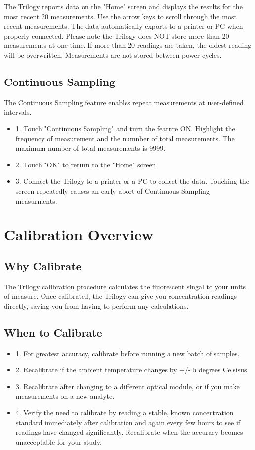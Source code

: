 \documentclass[12pt]{../SOP3_beta}
\begin{document}
\NP The Trilogy reports data on the "Home" screen and displays the results for the most recent 20 measurements. Use the arrow keys to scroll through the most recent measurements. The data automatically exports to a printer or PC when properly connected. Please note the Trilogy does NOT store more than 20 measurements at one time. If more than 20 readings are taken, the oldest reading will be overwritten. Measurements are not stored between power cycles.

\subsection{Continuous Sampling}
\NP The Continuous Sampling feature enables repeat measurements at user-defined intervals.
\begin{itemize}
  \item 1. Touch "Continuous Sampling" and turn the feature ON. Highlight the frequency of measurement and the numnber of total measurements. The maximum number of total measurements is 9999.
  \item 2. Touch "OK" to return to the "Home" screen.
  \item 3. Connect the Trilogy to a printer or a PC to collect the data. Touching the screen repeatedly causes an early-abort of Continuous Sampling measurments. 
\end{itemize}

\section{Calibration Overview}
\subsection{Why Calibrate}
\NP The Trilogy calibration procedure calculates the fluorescent singal to your units of measure. Once calibrated, the Trilogy can give you concentration readings directly, saving you from having to perform any calculations. 

\subsection{When to Calibrate}
\begin{itemize}
  \item 1. For greatest accuracy, calibrate before running a new batch of samples.
  \item 2. Recalibrate if the ambient temperature changes by +/- 5 degrees Celsisus.
  \item 3. Recalibrate after changing to a different optical module, or if you make measurements on a new analyte. 
  \item 4. Verify the need to calibrate by reading a stable, known concentration standard immediately after calibration and again every few hours to see if readings have changed significantly. Recalibrate when the accuracy beomes unacceptable for your study.
\end{itemize}
\end{document}
